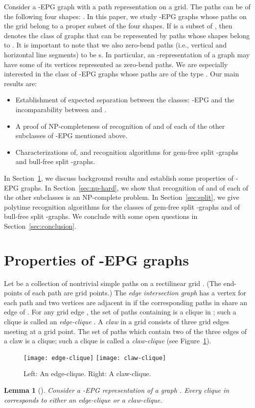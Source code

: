 \documentclass[11pt,3p,times]{elsarticle}
\newtheorem{lemma}[theorem]{Lemma}
\begin{document}
Consider a -EPG graph  with a path representation on a grid.
The paths can be of the following four shapes: . In this paper, we  study  -EPG graphs whose paths on
the grid belong to a proper subset of the four shapes.   
If 
is  a subset of , then 
denotes the class of graphs that can be represented by paths whose
shapes belong to . It is important to note that we also 
zero-bend paths (i.e., vertical and horizontal line segments) to be s. 
In particular, an -representation of a graph may have some of its vertices represented as zero-bend paths. 
We are especially interested in the class
 of -EPG graphs whose paths are of the type . Our
main results are:
\begin{itemize}
 \item Establishment of expected separation between the classes: -EPG
and the incomparability between  and .
 \item A proof of NP-completeness of recognition of  and
 of each of the other subclasses of -EPG mentioned above.
 \item Characterizations of, and recognition algorithms for
 gem-free split -graphs and bull-free split -graphs.
\end{itemize}
In Section~\ref{sec:properties}, we discuss background results and
establish some properties of -EPG graphs. In
Section~\ref{sec:np-hard}, we show that recognition of 
and of each of the other subclasses is
an NP-complete problem. In Section~\ref{sec:split}, we give
polytime recognition algorithms for the classes of
gem-free split -graphs and of bull-free split -graphs. We
conclude with some open questions in Section~\ref{sec:conclusion}.
\section{Properties of -EPG graphs}\label{sec:properties}
Let  be a collection of nontrivial simple paths on a rectilinear
grid . (The end-points of each path are grid points.)
The \textit{edge intersection graph}
 has a vertex  for each path  and two vertices are adjacent in 
if the corresponding paths in  share an edge of
. For any grid edge , the set of paths containing
 is a clique in ; such a clique is called an
\textit{edge-clique} \cite{Gol2009}. A \textit{claw} in a grid
consists of three grid edges meeting at a grid point.  The set of
paths which contain two of the three edges of a claw is a clique;
such a clique is called a \textit{claw-clique} \cite{Gol2009} (see
Figure~\ref{fig:edgeclique}).
\begin{figure}[h]
\hfill
\texttt{[image: edge-clique]}
\hfill
\texttt{[image: claw-clique]}
\hfill \ \caption{Left: An edge-clique. Right: A
claw-clique.}\label{fig:edgeclique}
\end{figure}
\begin{lemma}[\cite{Gol2009}]\label{lem:Gol2009}
Consider a -EPG representation
of a graph .
Every clique in  corresponds to either an edge-clique or a claw-clique.
\end{lemma}
\end{document}
